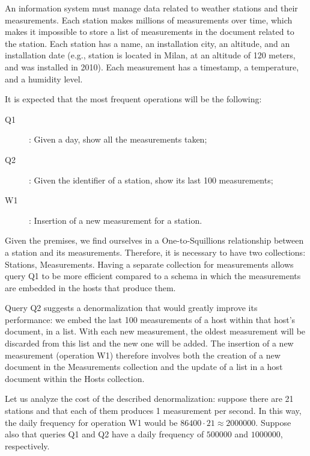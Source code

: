 \begin{example}{}
    An information system must manage data related to weather stations and their measurements.
    Each station makes millions of measurements over time, which makes it impossible to store a list of measurements in the document related to the station.
    Each station has a name, an installation city, an altitude, and an installation date (e.g., station  is located in Milan, at an altitude of 120 meters, and was installed in 2010).
    Each measurement has a timestamp, a temperature, and a humidity level.

    It is expected that the most frequent operations will be the following:
    \begin{description}
        \item[Q1]: Given a day, show all the measurements taken;
        \item[Q2]: Given the identifier of a station, show its last 100 measurements;
        \item[W1]: Insertion of a new measurement for a station.
    \end{description}

    Given the premises, we find ourselves in a One-to-Squillions relationship between a station and its measurements.
    Therefore, it is necessary to have two collections: Stations, Measurements.
    Having a separate collection for measurements allows query Q1 to be more efficient compared to a schema in which the measurements are embedded in the hosts that produce them.

    Query Q2 suggests a denormalization that would greatly improve its performance: we embed the last 100 measurements of a host within that host's document, in a list.
    With each new measurement, the oldest measurement will be discarded from this list and the new one will be added. The insertion of a new measurement (operation W1) therefore involves both the creation of a new document in the Measurements collection and the update of a list in a host document within the Hosts collection.

    Let us analyze the cost of the described denormalization: suppose there are 21 stations and that each of them produces 1 measurement per second. In this way, the daily frequency for operation W1 would be \(86400 \cdot 21 \approx 2000000\).
    Suppose also that queries Q1 and Q2 have a daily frequency of \(500000\) and \(1000000\), respectively.


\end{example}
